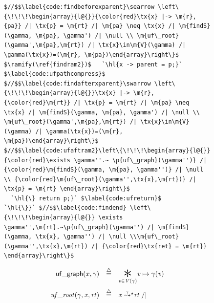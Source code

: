 \documentclass[acmsmall,screen]{acmart}
\newcommand{\reachable}[5]{\ensuremath{{\m{#1}\;\accentset{#2}{\leadsto}^{#3}_{#4} \m{#5}}}}
\newcommand{\defeq}{\mathbin{\stackrel{\triangle}{=}}}
\newcommand{\tx}[1]{\text{#1}}
\newcommand{\p}[1]{\ensuremath{\mathsf{#1}}} \newcommand{\m}[1]{\ensuremath{\mathit{#1}}} \newcommand{\ma}[1]{\ensuremath{\mathcal{#1}}} \let\ramify\lightning
\newcommand{\hl}[1]{\colorbox{lightgray}{#1}}
\begin{document}
\begin{figure}[t]
\begin{lstlisting}[multicols=2]
$//$$\label{code:findbeforexparent}\searrow \left\{\!\!\!\begin{array}{l@{}}{\color{red}\tx{x} |-> \m{r},{pa}} /| \tx{p} = \m{rt} /| \m{pa} \neq \tx{x} /| \m{findS}(\gamma, \m{pa}, \gamma') /| \null \\ \m{uf\_root}(\gamma',\m{pa},\m{rt}) /| \tx{x}\in\m{V}(\gamma) /| \gamma(\tx{x})=(\m{r}, \m{pa})\end{array}\right\}$
$\ramify(\ref{findram2})$   `\hl{x -> parent = p;}` $\label{code:ufpathcompress}$
$//$$\label{code:findafterxparent}\swarrow \left\{\!\!\!\begin{array}{l@{}}\tx{x} |-> \m{r},{\color{red}\m{rt}} /| \tx{p} = \m{rt} /| \m{pa} \neq \tx{x} /| \m{findS}(\gamma, \m{pa}, \gamma') /| \null \\ \m{uf\_root}(\gamma',\m{pa},\m{rt}) /| \tx{x}\in\m{V}(\gamma) /| \gamma(\tx{x})=(\m{r}, \m{pa})\end{array}\right\}$
$//$$\label{code:ufaftram2}\left\{\!\!\!\begin{array}{l@{}} {\color{red}\exists \gamma''.~ \p{uf\_graph}(\gamma'')} /| {\color{red}\m{findS}(\gamma, \m{pa}, \gamma'')} /| \null \\ {\color{red}\m{uf\_root}(\gamma'',\tx{x},\m{rt})} /| \tx{p} = \m{rt} \end{array}\right\}$
  `\hl{\} return p;}` $\label{code:ufreturn}$
`\hl{\}}` $//$$\label{code:findend} \left\{\!\!\!\begin{array}{l@{}} \exists \gamma'',\m{rt}.~\p{uf\_graph}(\gamma'') /| \m{findS}(\gamma, \tx{x}, \gamma'') /| \null \\\m{uf\_root}(\gamma'',\tx{x},\m{rt}) /| {\color{red}\tx{ret} = \m{rt}}  \end{array}\right\}$
\end{lstlisting}
\vspace*{-1ex}
{\footnotesize
\begin{flushleft}
\hspace{-3em}
\begin{minipage}[c]{0.46\textwidth}
\vspace*{-1ex}
\begin{equation*}
\label{eqn:ufgraphdefn}
\begin{array}{@{}l@{}lcl@{}}
\multicolumn{2}{r}{\p{uf\_graph}(x, \gamma)} & \defeq & \underset{\m{v} \in \m{V}(\gamma)}{\bigstar} \m{v}	\mapsto\gamma(\m{v}) \\
[15pt]
\m{uf\_root}(\gamma,\m{x},\m{rt})&& \defeq & \reachable{x}{\gamma}{\star}{}{rt} \; /| \null \\ 	

\end{array}
\end{equation*}
\end{minipage}
\end{flushleft}}
\end{figure}
\end{document}

